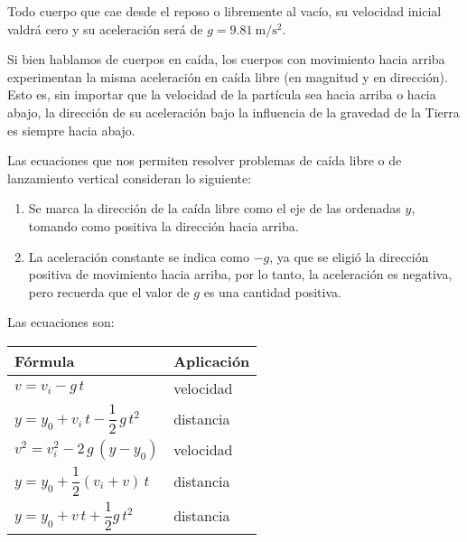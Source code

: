 \documentclass[14pt]{extarticle}
\begin{document}
Todo cuerpo que cae desde el reposo o libremente al vacío, su velocidad inicial valdrá cero y su aceleración será de $g = \SI{9.81}{\meter\per\square\second}$.
\par
Si bien hablamos de cuerpos en caída, los cuerpos con movimiento hacia arriba experimentan la misma aceleración en caída libre (en magnitud y en dirección). Esto es, sin importar que la velocidad de la partícula sea hacia arriba o hacia abajo, la dirección de su aceleración bajo la influencia de la gravedad de la Tierra es siempre hacia abajo.
\par
Las ecuaciones que nos permiten resolver problemas de caída libre o de lanzamiento vertical consideran lo siguiente:
\begin{enumerate}
\item Se marca la dirección de la caída libre como el eje de las ordenadas $y$, tomando como positiva la dirección hacia arriba.
\item La aceleración constante se indica como $-g$, ya que se eligió la dirección positiva de movimiento hacia arriba, por lo tanto, la aceleración es negativa, pero recuerda que el valor de $g$ es una cantidad positiva.
\end{enumerate}
Las ecuaciones son:
\begin{table}[H]
\renewcommand{\arraystretch}{2.5}
\centering
\begin{tabular}{l | l}
Fórmula & Aplicación \\ \hline
$v = v_{i} - g \, t$ & velocidad \\ \hline
$y = y_{0} + v_{i} \, t - \dfrac{1}{2} \, g \, t^{2}$ & distancia \\ \hline
$v^{2} = v_{i}^{2} - 2 \, g \, (y - y_{0})$ & velocidad \\ \hline
$y = y_{0} + \dfrac{1}{2} (v_{i} + v) \, t$ & distancia \\ \hline
$y = y_{0} + v \, t + \dfrac{1}{2} g \, t^{2}$ & distancia \\ \hline
\end{tabular}
\end{table}
\end{document}
